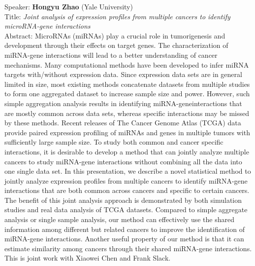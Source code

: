 \documentclass[11pt]{article}
\begin{document}
\bigskip
\noindent
Speaker: {\bf Hongyu Zhao} (Yale University)\\
Title: {\it Joint analysis of expression profiles from multiple cancers to identify microRNA-gene interactions}\\
Abstract: MicroRNAs (miRNAs) play a crucial role in tumorigenesis and
development through their effects on target genes. The
characterization of miRNA-gene interactions will lead to a better
understanding of cancer mechanisms. Many computational methods have
been developed to infer miRNA targets with/without expression
data. Since expression data sets are in general limited in size, most
existing methods concatenate datasets from multiple studies to form
one aggregated dataset to increase sample size and power. However,
such simple aggregation analysis results in identifying
miRNA-geneinteractions that are mostly common across data sets,
whereas specific interactions may be missed by these methods. Recent
releases of The Cancer Genome Atlas (TCGA) data provide paired
expression profiling of miRNAs and genes in multiple tumors with
sufficiently large sample size. To study both common and cancer
specific interactions, it is desirable to develop a method that can
jointly analyze multiple cancers to study miRNA-gene interactions
without combining all the data into one single data set. In this
presentation, we describe a novel statistical method to jointly
analyze expression profiles from multiple cancers to identify
miRNA-gene interactions that are both common across cancers and
specific to certain cancers. The benefit of this joint analysis
approach is demonstrated by both simulation studies and real data
analysis of TCGA datasets. Compared to simple aggregate analysis or
single sample analysis, our method can effectively use the shared
information among different but related cancers to improve the
identification of miRNA-gene interactions. Another useful property of
our method is that it can estimate similarity among cancers through
their shared miRNA-gene interactions. This is joint work with Xiaowei
Chen and Frank Slack.
\end{document}
